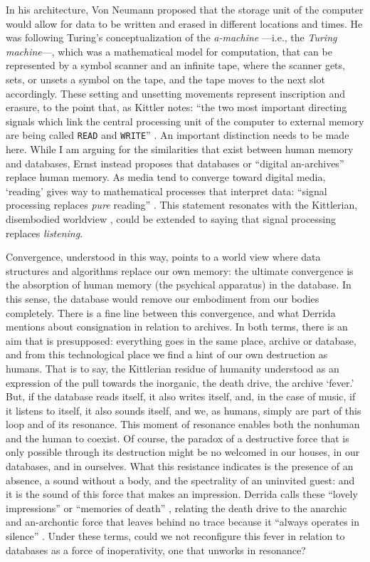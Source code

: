 In his architecture, Von Neumann proposed that the storage unit of the computer would allow for data to be written and erased in different locations and times. He was following Turing's conceptualization of the \textit{a-machine} ---i.e., the \textit{Turing machine}---, which was a mathematical model for computation, that can be represented by a symbol scanner and an infinite tape, where the scanner gets, sets, or unsets a symbol on the tape, and the tape moves to the next slot accordingly. These setting and unsetting movements represent inscription and erasure, to the point that, as Kittler notes: ``the two most important directing signals which link the central processing unit of the computer to external memory are being called \texttt{READ} and \texttt{WRITE}'' \parencite[131]{Ern13:Dig}. An important distinction needs to be made here. While I am arguing for the similarities that exist between human memory and databases, Ernst instead proposes that databases or ``digital an-archives'' replace human memory. As media tend to converge toward digital media, `reading’ gives way to mathematical processes that interpret data: ``signal processing replaces \textit{pure} reading'' \im \parencite[130]{Ern13:Dig}. This statement resonates with the Kittlerian, disembodied worldview , could be extended to saying that signal processing replaces \textit{listening}. 


Convergence, understood in this way, points to a world view where data structures and algorithms replace our own memory: the ultimate convergence is the absorption of human memory (the psychical apparatus) in the database. In this sense, the database would remove our embodiment from our bodies completely. There is a fine line between this convergence, and what Derrida mentions about consignation in relation to archives. In both terms, there is an aim that is presupposed: everything goes in the same place, archive or database, and from this technological place we find a hint of our own destruction as humans. That is to say, the Kittlerian residue of humanity understood as an expression of the pull towards the inorganic, the death drive, the archive `fever.' But, if the database reads itself, it also writes itself, and, in the case of music, if it listens to itself, it also sounds itself, and we, as humans, simply are part of this loop and of its resonance. This moment of resonance enables both the nonhuman and the human to coexist. Of course, the paradox of a destructive force that is only possible through its destruction might be no welcomed in our houses, in our databases, and in ourselves. What this resistance indicates is the presence of an absence, a sound without a body, and the spectrality of an uninvited guest: and it is the sound of this force that makes an impression. Derrida calls these ``lovely impressions'' or ``memories of death'' \parencite[14]{Der95:Arc}, relating the death drive to the anarchic and an-archontic force that leaves behind no trace because it ``always operates in silence'' \parencite[14]{Der95:Arc}. Under these terms, could we not reconfigure this fever in relation to databases as a force of inoperativity, one that unworks in resonance?


